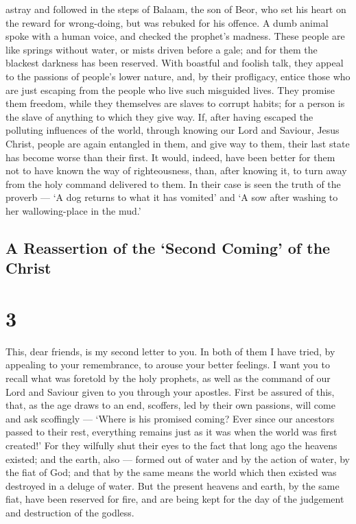 astray and followed in the steps of Balaam, the son of Beor, who set his
heart on the reward for wrong-doing,  but was rebuked for
his offence. A dumb animal spoke with a human voice, and checked the
prophet's madness.  These people are like springs without
water, or mists driven before a gale; and for them the blackest darkness
has been reserved.  With boastful and foolish talk, they
appeal to the passions of people's lower nature, and, by their
profligacy, entice those who are just escaping from the people who live
such misguided lives.  They promise them freedom, while
they themselves are slaves to corrupt habits; for a person is the slave
of anything to which they give way.  If, after having
escaped the polluting influences of the world, through knowing our Lord
and Saviour, Jesus Christ, people are again entangled in them, and give
way to them, their last state has become worse than their first.
 It would, indeed, have been better for them not to have
known the way of righteousness, than, after knowing it, to turn away
from the holy command delivered to them.  In their case is
seen the truth of the proverb --- `A dog returns to what it has vomited'
and `A sow after washing to her wallowing-place in the mud.'

\hypertarget{a-reassertion-of-the-second-coming-of-the-christ}{%
\subsection{A Reassertion of the `Second Coming' of the
Christ}\label{a-reassertion-of-the-second-coming-of-the-christ}}

\hypertarget{section-2}{%
\section{3}\label{section-2}}

 This, dear friends, is my second letter to you. In both of
them I have tried, by appealing to your remembrance, to arouse your
better feelings.  I want you to recall what was foretold by
the holy prophets, as well as the command of our Lord and Saviour given
to you through your apostles.  First be assured of this,
that, as the age draws to an end, scoffers, led by their own passions,
 will come and ask scoffingly --- `Where is his promised
coming? Ever since our ancestors passed to their rest, everything
remains just as it was when the world was first created!' 
For they wilfully shut their eyes to the fact that long ago the heavens
existed; and the earth, also --- formed out of water and by the action
of water, by the fiat of God;  and that by the same means
the world which then existed was destroyed in a deluge of water.
 But the present heavens and earth, by the same fiat, have
been reserved for fire, and are being kept for the day of the judgement
and destruction of the godless.

